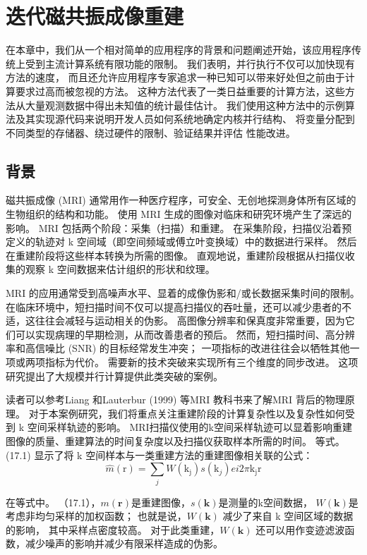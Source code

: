 \section{迭代磁共振成像重建}
在本章中，我们从一个相对简单的应用程序的背景和问题阐述开始，该应用程序传统上受到主流计算系统有限功能的限制。 
我们表明，并行执行不仅可以加快现有方法的速度，
而且还允许应用程序专家追求一种已知可以带来好处但之前由于计算要求过高而被忽视的方法。 
这种方法代表了一类日益重要的计算方法，这些方法从大量观测数据中得出未知值的统计最佳估计。 
我们使用这种方法中的示例算法及其实现源代码来说明开发人员如何系统地确定内核并行结构、
将变量分配到不同类型的存储器、绕过硬件的限制、验证结果并评估 性能改进。

\subsection{背景}
磁共振成像 (MRI) 通常用作一种医疗程序，可安全、无创地探测身体所有区域的生物组织的结构和功能。 
使用 MRI 生成的图像对临床和研究环境产生了深远的影响。 MRI 包括两个阶段：采集（扫描）和重建。 
在采集阶段，扫描仪沿着预定义的轨迹对 k 空间域（即空间频域或傅立叶变换域）中的数据进行采样。 
然后在重建阶段将这些样本转换为所需的图像。 直观地说，重建阶段根据从扫描仪收集的观察 k 空间数据来估计组织的形状和纹理。

MRI 的应用通常受到高噪声水平、显着的成像伪影和/或长数据采集时间的限制。 
在临床环境中，短扫描时间不仅可以提高扫描仪的吞吐量，还可以减少患者的不适，这往往会减轻与运动相关的伪影。 
高图像分辨率和保真度非常重要，因为它们可以实现病理的早期检测，从而改善患者的预后。 
然而，短扫描时间、高分辨率和高信噪比 (SNR) 的目标经常发生冲突； 一项指标的改进往往会以牺牲其他一项或两项指标为代价。 
需要新的技术突破来实现所有三个维度的同步改进。 这项研究提出了大规模并行计算提供此类突破的案例。

读者可以参考Liang 和Lauterbur (1999) 等MRI 教科书来了解MRI 背后的物理原理。 
对于本案例研究，我们将重点关注重建阶段的计算复杂性以及复杂性如何受到 k 空间采样轨迹的影响。 
MRI扫描仪使用的k空间采样轨迹可以显着影响重建图像的质量、重建算法的时间复杂度以及扫描仪获取样本所需的时间。 
等式。 (17.1) 显示了将 k 空间样本与一类重建方法的重建图像相关联的公式：
$$
\widehat{m}(\mathrm{r})=\sum_{j} W\left(\mathrm{k}_{\mathrm{j}}\right) s\left(\mathrm{k}_{j }\right) e i 2 \pi \mathrm{k}_{\mathrm{j}} \mathrm{r}
$$

在等式中。 （17.1），$m(\mathbf{r})$是重建图像，$s(\mathbf{k})$是测量的k空间数据，
$W(\mathbf{k})$是 考虑非均匀采样的加权函数； 也就是说，$W(\mathbf{k})$ 减少了来自 k 空间区域的数据的影响，
其中采样点密度较高。 对于此类重建，$W(\mathbf{k})$ 还可以用作变迹滤波函数，减少噪声的影响并减少有限采样造成的伪影。

